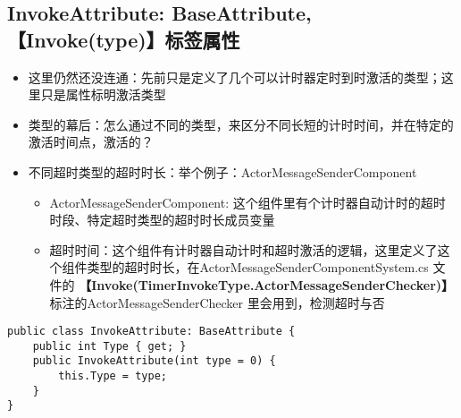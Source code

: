 \documentclass[9pt, b5paper]{article}
\begin{document}
\subsection{InvokeAttribute: BaseAttribute, 【Invoke(type)】标签属性}
\label{sec-2-21}
\begin{itemize}
\item 这里仍然还没连通：先前只是定义了几个可以计时器定时到时激活的类型；这里只是属性标明激活类型
\item 类型的幕后：怎么通过不同的类型，来区分不同长短的计时时间，并在特定的激活时间点，激活的？
\item 不同超时类型的超时时长：举个例子：ActorMessageSenderComponent
\begin{itemize}
\item ActorMessageSenderComponent: 这个组件里有个计时器自动计时的超时时段、特定超时类型的超时时长成员变量
\item 超时时间：这个组件有计时器自动计时和超时激活的逻辑，这里定义了这个组件类型的超时时长，在ActorMessageSenderComponentSystem.cs 文件的 \textbf{【Invoke(TimerInvokeType.ActorMessageSenderChecker)】} 标注的ActorMessageSenderChecker 里会用到，检测超时与否
\end{itemize}
\end{itemize}
\begin{verbatim}
public class InvokeAttribute: BaseAttribute {
    public int Type { get; }
    public InvokeAttribute(int type = 0) {
        this.Type = type;
    }
}
\end{verbatim}
\end{document}
